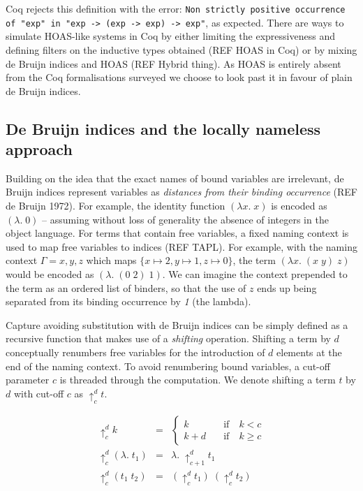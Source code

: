 \documentclass[]{unswthesis}
\begin{document}
Coq rejects this definition with the error: \texttt{Non strictly positive occurrence of "exp" in
 "exp -> (exp -> exp) -> exp"}, as expected. There are ways to simulate HOAS-like systems in Coq by either limiting the expressiveness and defining filters on the inductive types obtained (REF HOAS in Coq) or by mixing de Bruijn indices and HOAS (REF Hybrid thing). As HOAS is entirely absent from the Coq formalisations surveyed we choose to look past it in favour of plain de Bruijn indices.

\subsection{De Bruijn indices and the locally nameless approach}

Building on the idea that the exact names of bound variables are irrelevant, de Bruijn indices represent variables as \textit{distances from their binding occurrence} (REF de Bruijn 1972). For example, the identity function $(\lambda x. \; x)$ is encoded as $(\lambda . \; 0)$ -- assuming without loss of generality the absence of integers in the object language. For terms that contain free variables, a fixed naming context is used to map free variables to indices (REF TAPL). For example, with the naming context $\Gamma = x, y, z$ which maps $\{x \mapsto 2, y \mapsto 1, z \mapsto 0\}$, the term $(\lambda x. \; (x \; y) \; z)$ would be encoded as $(\lambda. \; (0 \; 2) \; 1)$. We can imagine the context prepended to the term as an ordered list of binders, so that the use of $z$ ends up being separated from its binding occurrence by \textit{1} (the lambda).

Capture avoiding substitution with de Bruijn indices can be simply defined as a recursive function that makes use of a \textit{shifting} operation. Shifting a term by $d$ conceptually renumbers free variables for the introduction of $d$ elements at the end of the naming context. To avoid renumbering bound variables, a cut-off parameter $c$ is threaded through the computation. We denote shifting a term $t$ by $d$ with cut-off $c$ as $\uparrow^d_c t$.

\begin{eqnarray*}
\uparrow^d_c k & = &
	\begin{cases}
	k \quad & \text{if} \quad k < c \\
	k + d \quad & \text{if} \quad k \geq c
	\end{cases}\\
\uparrow^d_c (\lambda. \; t_1) & = & \lambda. \; \uparrow^d_{c + 1} t_1\\
\uparrow^d_c (t_1 \; t_2) & = & (\uparrow^d_c t_1) \; (\uparrow^d_c t_2)
\end{eqnarray*}
\end{document}
